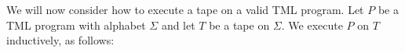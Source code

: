 

We will now consider how to execute a tape on a valid TML program. Let $P$ be a TML program with alphabet $\Sigma$ and let $T$ be a tape on $\Sigma$. We execute $P$ on $T$ inductively, as follows:
